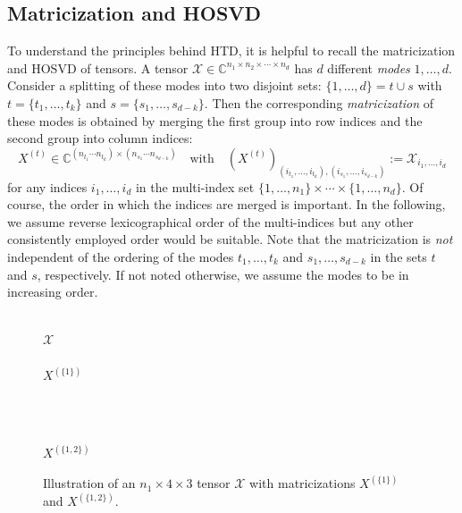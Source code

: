 \documentclass[11pt, a4paper]{article}
\newcommand{\calX}{\mathcal{X}}
\newcommand{\C}{{\mathbb C}}
\DeclareMathOperator{\vect}{vec}
\begin{document}
\subsection{Matricization and HOSVD} \label{sec:hosvd}

To understand the principles behind HTD, it is helpful to recall the matricization and HOSVD of tensors.
A tensor $\calX \in \C^{n_1\times n_2\times\cdots \times n_d}$ has $d$ different \emph{modes} $1,\ldots,d$.
Consider a splitting of these modes into two disjoint sets:
$\{1,\ldots,d\}  = t\cup s$ with $t = \{t_1,\ldots,t_k\}$ and $s = \{s_1,\ldots,s_{d-k}\}$.
Then the corresponding \emph{matricization} of these modes is obtained by
merging the first group into row indices and the second group into column indices:
\[
 X^{(t)} \in \C^{(n_{t_1}\cdots n_{t_k}) \times (n_{s_1}\cdots n_{s_{d-k}})} \quad \text{with}
\quad \left( X^{(t)} \right)_{(i_{t_1},\ldots,i_{t_k}),(i_{s_1},\ldots,i_{s_{d-k}})} := \calX_{i_1,\ldots,i_d}
\]
for any indices $i_1,\ldots,i_d$ in the multi-index set $\{1,\ldots,n_1\}\times \cdots \times \{1,\ldots,n_d\}$.
Of course, the order in which the indices are merged is important.
In the following, we assume reverse lexicographical order of the multi-indices but any other consistently employed order would be suitable.
Note that the matricization is \emph{not} independent of the ordering of the modes
$t_1,\ldots,t_k$ and $s_1,\ldots,s_{d-k}$ in the sets $t$ and $s$, respectively. If not
noted otherwise, we assume the modes to be in increasing order.

\begin{preprint}
\begin{figure}
 \begin{center}
  \begin{minipage}{0.3\textwidth}
\begin{center}
    \\
$\calX$  \\[0.2cm]
  \\
$X^{(\{1\})}$ 
\end{center}
  \end{minipage}$\quad$
\begin{minipage}{0.3\textwidth}
  \\ 
$X^{(\{1,2\})}$ 
\end{minipage}
 \end{center}
\caption{Illustration of an $n_1\times 4 \times 3$ tensor $\calX$ with matricizations $X^{(\{1\})}$ and $X^{(\{1,2\})}$.}
\end{figure}
\end{preprint}
\end{document}

